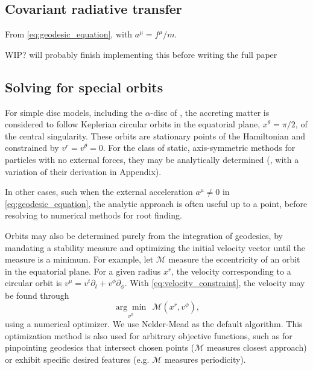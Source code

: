 \subsection{Covariant radiative transfer}
From \eqref{eq:geodesic_equation}, with $a^\mu = f^\mu / m$.

WIP? will probably finish implementing this before writing the full paper


\subsection{Solving for special orbits}

For simple disc models, including the $\alpha$-disc of \cite{shakura_black_1973}, the accreting matter is considered to follow Keplerian circular orbits in the equatorial plane, $x^\theta = \pi/2$, of the central singularity. These orbits are stationary points of the Hamiltonian and constrained by $v^r = v^\theta = 0$. For the class of static, axis-symmetric methods for particles with no external forces, they may be analytically determined (\cite{johannsen_regular_2013}, with a variation of their derivation in Appendix).

In other cases, such when the external acceleration $a^\mu \neq 0$ in \eqref{eq:geodesic_equation}, the analytic approach is often useful up to a point, before resolving to numerical methods for root finding.

Orbits may also be determined purely from the integration of geodesics, by mandating a stability measure and optimizing the initial velocity vector until the measure is a minimum. For example, let $\mathscr{M}$ measure the eccentricity of an orbit in the equatorial plane. For a given radius $x^r$, the velocity corresponding to a circular orbit is $v^\mu = v^t \partial_t + v^\phi \partial_\phi $. With \eqref{eq:velocity_constraint}, the velocity may be found through
\begin{equation}
    \underset{v^\phi}{\arg \min}\ \ \mathscr{M}(x^r, v^\phi),
\end{equation}
using a numerical optimizer. We use Nelder-Mead as the default algorithm. This optimization method is also used for arbitrary objective functions, such as for pinpointing geodesics that intersect chosen points ($\mathscr{M}$ measures closest approach) or exhibit specific desired features (e.g. $\mathscr{M}$ measures periodicity).


